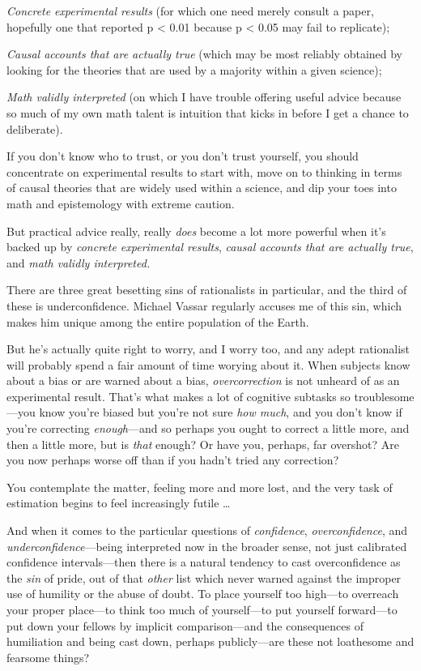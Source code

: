 {
 \textit{Concrete} \textit{experimental results} (for which one
need merely consult a paper, hopefully one that reported p {\textless}
0.01 because p {\textless} 0.05 may fail to replicate);}

{
 \textit{Causal accounts that are actually true} (which may be most
reliably obtained by looking for the theories that are used by a
majority within a given science);}

{
 \textit{Math validly interpreted} (on which I have trouble
offering useful advice because so much of my own math talent is
intuition that kicks in before I get a chance to deliberate).}

{
 If you don't know who to trust, or you
don't trust yourself, you should concentrate on
experimental results to start with, move on to thinking in terms of
causal theories that are widely used within a science, and dip your
toes into math and epistemology with extreme caution.}

{
 But practical advice really, really \textit{does} become a lot
more powerful when it's backed up by \textit{concrete
experimental results}, \textit{causal accounts that are actually true},
and \textit{math validly interpreted.}}

\myendsectiontext


{
 There are three great besetting sins of rationalists in
particular, and the third of these is underconfidence. Michael Vassar
regularly accuses me of this sin, which makes him unique among the
entire population of the Earth. }

{
 But he's actually quite right to worry, and I
worry too, and any adept rationalist will probably spend a fair amount
of time worying about it. When subjects know about a bias or are warned
about a bias, \textit{overcorrection} is not unheard of as an
experimental result. That's what makes a lot of
cognitive subtasks so troublesome---you know you're
biased but you're not sure \textit{how much}, and you
don't know if you're correcting
\textit{enough}{}---and so perhaps you ought to correct a little more,
and then a little more, but is \textit{that} enough? Or have you,
perhaps, far overshot? Are you now perhaps worse off than if you
hadn't tried any correction?}

{
 You contemplate the matter, feeling more and more lost, and the
very task of estimation begins to feel increasingly futile \ldots}

{
 And when it comes to the particular questions of
\textit{confidence}, \textit{overconfidence}, and
\textit{underconfidence}{}---being interpreted now in the broader
sense, not just calibrated confidence intervals---then there is a
natural tendency to cast overconfidence as the \textit{sin} of pride,
out of that \textit{other} list which never warned against the improper
use of humility or the abuse of doubt. To place yourself too high---to
overreach your proper place---to think too much of yourself---to put
yourself forward---to put down your fellows by implicit
comparison---and the consequences of humiliation and being cast down,
perhaps publicly---are these not loathesome and fearsome things?}

